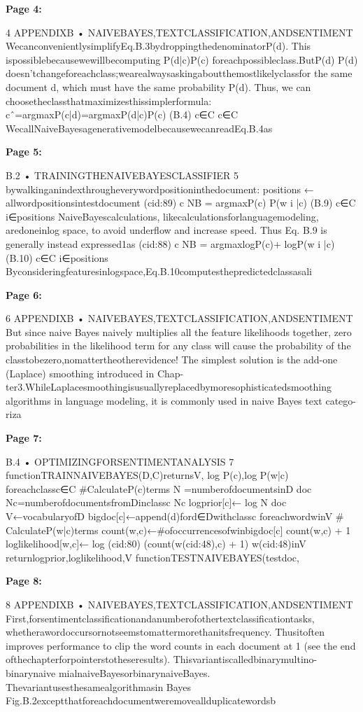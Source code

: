 \documentclass[11pt,a4paper]{article}
\begin{document}
\textbf{Page 4:}

4 APPENDIXB • NAIVEBAYES,TEXTCLASSIFICATION,ANDSENTIMENT
WecanconvenientlysimplifyEq.B.3bydroppingthedenominatorP(d). This
ispossiblebecausewewillbecomputing P(d|c)P(c) foreachpossibleclass.ButP(d)
P(d)
doesn’tchangeforeachclass;wearealwaysaskingaboutthemostlikelyclassfor
the same document d, which must have the same probability P(d). Thus, we can
choosetheclassthatmaximizesthissimplerformula:
cˆ=argmaxP(c|d)=argmaxP(d|c)P(c) (B.4)
c∈C c∈C
WecallNaiveBayesagenerativemodelbecausewecanreadEq.B.4as

\textbf{Page 5:}

B.2 • TRAININGTHENAIVEBAYESCLASSIFIER 5
bywalkinganindexthrougheverywordpositioninthedocument:
positions ← allwordpositionsintestdocument
(cid:89)
c NB = argmaxP(c) P(w i |c) (B.9)
c∈C
i∈positions
NaiveBayescalculations, likecalculationsforlanguagemodeling, aredoneinlog
space, to avoid underflow and increase speed. Thus Eq. B.9 is generally instead
expressed1as
(cid:88)
c NB = argmaxlogP(c)+ logP(w i |c) (B.10)
c∈C
i∈positions
Byconsideringfeaturesinlogspace,Eq.B.10computesthepredictedclassasali

\textbf{Page 6:}

6 APPENDIXB • NAIVEBAYES,TEXTCLASSIFICATION,ANDSENTIMENT
But since naive Bayes naively multiplies all the feature likelihoods together, zero
probabilities in the likelihood term for any class will cause the probability of the
classtobezero,nomattertheotherevidence!
The simplest solution is the add-one (Laplace) smoothing introduced in Chap-
ter3.WhileLaplacesmoothingisusuallyreplacedbymoresophisticatedsmoothing
algorithms in language modeling, it is commonly used in naive Bayes text catego-
riza

\textbf{Page 7:}

B.4 • OPTIMIZINGFORSENTIMENTANALYSIS 7
functionTRAINNAIVEBAYES(D,C)returnsV, log P(c),log P(w|c)
foreachclassc∈C \#CalculateP(c)terms
N =numberofdocumentsinD
doc
Nc=numberofdocumentsfromDinclassc
Nc
logprior[c]← log
N
doc
V←vocabularyofD
bigdoc[c]←append(d)ford∈Dwithclassc
foreachwordwinV \# CalculateP(w|c)terms
count(w,c)←\#ofoccurrencesofwinbigdoc[c]
count(w,c) + 1
loglikelihood[w,c]← log (cid:80) (count(w(cid:48),c) + 1)
w(cid:48)inV
returnlogprior,loglikelihood,V
functionTESTNAIVEBAYES(testdoc,

\textbf{Page 8:}

8 APPENDIXB • NAIVEBAYES,TEXTCLASSIFICATION,ANDSENTIMENT
First,forsentimentclassificationandanumberofothertextclassificationtasks,
whetherawordoccursornotseemstomattermorethanitsfrequency. Thusitoften
improves performance to clip the word counts in each document at 1 (see the end
ofthechapterforpointerstotheseresults). Thisvariantiscalledbinarymultino-
binarynaive mialnaiveBayesorbinarynaiveBayes. Thevariantusesthesamealgorithmasin
Bayes
Fig.B.2exceptthatforeachdocumentweremoveallduplicatewordsb
\end{document}
